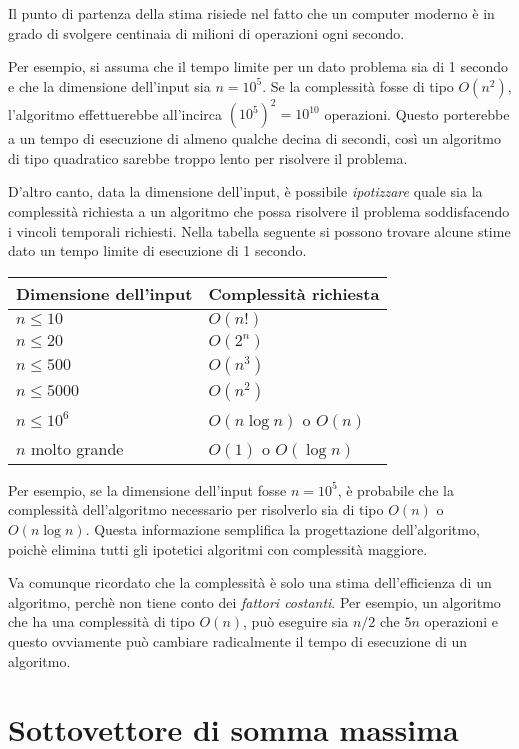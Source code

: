 Il punto di partenza della stima risiede nel fatto che 
un computer moderno è in grado di svolgere centinaia di 
milioni di operazioni ogni secondo.

Per esempio, si assuma che il tempo limite per un dato
problema sia di 1 secondo e che la dimensione dell'input sia $n=10^5$.
Se la complessità fosse di tipo $O(n^2)$,
l'algoritmo effettuerebbe all'incirca $(10^5)^2=10^{10}$ operazioni.
Questo porterebbe a un tempo di esecuzione di almeno qualche decina di secondi,
così un algoritmo di tipo quadratico sarebbe troppo lento per 
risolvere il problema.

D'altro canto, data la dimensione dell'input,
è possibile \emph{ipotizzare} quale sia la complessità
richiesta a un algoritmo che possa risolvere il problema
soddisfacendo i vincoli temporali richiesti.
Nella tabella seguente si possono trovare alcune stime 
dato un tempo limite di esecuzione di 1 secondo.

\begin{center}
\begin{tabular}{ll}
Dimensione dell'input & Complessità richiesta \\
\hline
$n \le 10$ & $O(n!)$ \\
$n \le 20$ & $O(2^n)$ \\
$n \le 500$ & $O(n^3)$ \\
$n \le 5000$ & $O(n^2)$ \\
$n \le 10^6$ & $O(n \log n)$ o $O(n)$ \\
$n$ molto grande & $O(1)$ o $O(\log n)$ \\
\end{tabular}
\end{center}

Per esempio, se la dimensione dell'input fosse $n=10^5$,
è probabile che la complessità dell'algoritmo necessario
per risolverlo sia di tipo $O(n)$ o $O(n \log n)$.
Questa informazione semplifica la progettazione dell'algoritmo,
poichè elimina tutti gli ipotetici algoritmi 
con complessità maggiore.


Va comunque ricordato che la complessità è solo una
stima dell'efficienza di un algoritmo,
perchè non tiene conto dei \emph{fattori costanti}.
Per esempio, un algoritmo che ha una complessità di tipo $O(n)$,
può eseguire sia $n/2$ che $5n$ operazioni e 
questo ovviamente può cambiare radicalmente il tempo
di esecuzione di un algoritmo.

\section{Sottovettore di somma massima}

